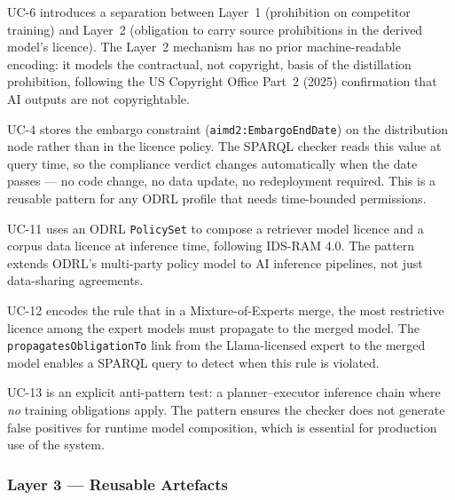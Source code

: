 \documentclass[12pt,a4paper]{article}
\begin{document}
\begin{description}[leftmargin=3.2cm, style=nextline]
  \item[Two-layer distillation model] UC-6 introduces a separation between Layer~1 (prohibition on competitor training) and Layer~2 (obligation to carry source prohibitions in the derived model's licence). The Layer~2 mechanism has no prior machine-readable encoding: it models the contractual, not copyright, basis of the distillation prohibition, following the US Copyright Office Part~2 (2025) confirmation that AI outputs are not copyrightable.

  \item[Temporal self-resolution] UC-4 stores the embargo constraint (\texttt{aimd2:EmbargoEndDate}) on the distribution node rather than in the licence policy. The SPARQL checker reads this value at query time, so the compliance verdict changes automatically when the date passes — no code change, no data update, no redeployment required. This is a reusable pattern for any ODRL profile that needs time-bounded permissions.

  \item[Multi-asset PolicySet pattern] UC-11 uses an ODRL \texttt{PolicySet} to compose a retriever model licence and a corpus data licence at inference time, following IDS-RAM 4.0. The pattern extends ODRL's multi-party policy model to AI inference pipelines, not just data-sharing agreements.

  \item[Strictest-survives inheritance rule] UC-12 encodes the rule that in a Mixture-of-Experts merge, the most restrictive licence among the expert models must propagate to the merged model. The \texttt{propagatesObligationTo} link from the Llama-licensed expert to the merged model enables a SPARQL query to detect when this rule is violated.

  \item[True-negative inference discrimination] UC-13 is an explicit anti-pattern test: a planner--executor inference chain where \emph{no} training obligations apply. The pattern ensures the checker does not generate false positives for runtime model composition, which is essential for production use of the system.
\end{description}

\subsubsection*{Layer 3 — Reusable Artefacts}
\end{document}
